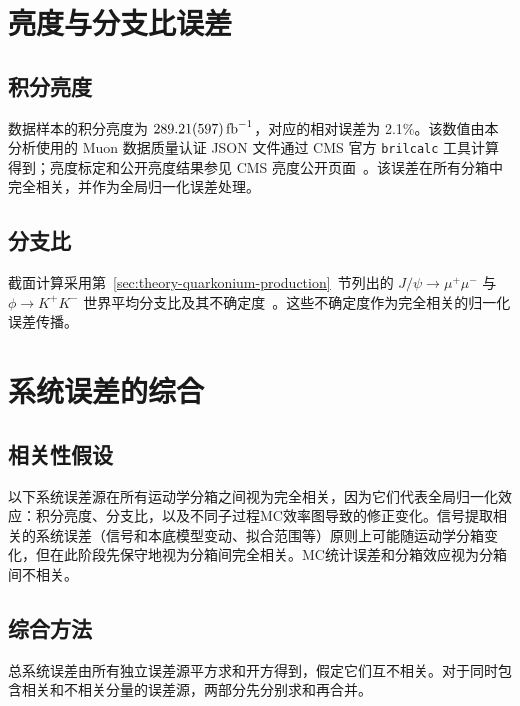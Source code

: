 \section{亮度与分支比误差}
\label{sec:syst-normalization}

\subsection{积分亮度}
\label{subsec:syst-luminosity}

数据样本的积分亮度为 $\SI{289.21 \pm 5.97}{\per\femto\barn}$，对应的相对误差为 2.1\%。该数值由本分析使用的 Muon 数据质量认证 JSON 文件通过 CMS 官方 \texttt{brilcalc} 工具计算得到；亮度标定和公开亮度结果参见 CMS 亮度公开页面~\cite{CMS:LUMI-PUB}。该误差在所有分箱中完全相关，并作为全局归一化误差处理。

\subsection{分支比}
\label{subsec:syst-branching-fractions}

截面计算采用第~\ref{sec:theory-quarkonium-production}~节列出的 $J/\psi \to \mu^+\mu^-$ 与 $\phi \to K^+K^-$ 世界平均分支比及其不确定度~\cite{PDG2024}。这些不确定度作为完全相关的归一化误差传播。

\section{系统误差的综合}
\label{sec:syst-combination}

\subsection{相关性假设}
\label{subsec:syst-correlations}

以下系统误差源在所有运动学分箱之间视为完全相关，因为它们代表全局归一化效应：积分亮度、分支比，以及不同子过程MC效率图导致的修正变化。信号提取相关的系统误差（信号和本底模型变动、拟合范围等）原则上可能随运动学分箱变化，但在此阶段先保守地视为分箱间完全相关。MC统计误差和分箱效应视为分箱间不相关。

\subsection{综合方法}
\label{subsec:syst-combination-procedure}

总系统误差由所有独立误差源平方求和开方得到，假定它们互不相关。对于同时包含相关和不相关分量的误差源，两部分先分别求和再合并。

